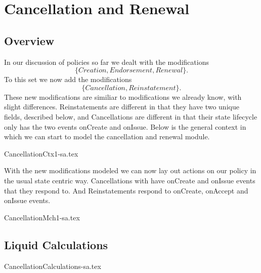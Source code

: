 \chapter{Cancellation and Renewal}
\label{intro} %


\section{Overview}
\label{sec:02:1}
In our discussion of policies so far we dealt with the modifications
\begin{equation*}
  \{Creation, Endorsement, Renewal\}.
\end{equation*}
To this set we now
add the modifications
\begin{equation*}
  \{Cancellation, Reinstatement\}.
\end{equation*}
These new modifications are similiar to modifications we already
know, with slight differences. Reinstatements are different in that they have two unique fields, described below, and Cancellations
are different in that their state lifecycle only has the two events onCreate and onIssue. Below is the general context in which
we can start to model the cancellation and renewal module.

{CancellationCtx1-sa.tex}

With the new modifications modeled we can now lay out actions on our policy in the usual state centric way. Cancellations with have
onCreate and onIssue events that they respond to. And Reinstatements respond to onCreate, onAccept and onIssue events. 

{CancellationMch1-sa.tex}

\section{Liquid Calculations}
\label{sec:02:2}

{CancellationCalculations-sa.tex}
